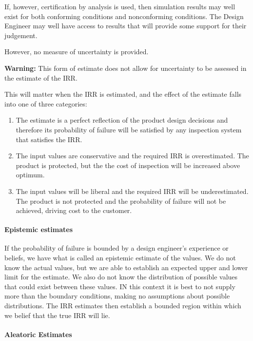 \documentclass[
]{article}
\providecommand{\tightlist}{%
  \setlength{\itemsep}{0pt}\setlength{\parskip}{0pt}}
\begin{document}
If, however, certification by analysis is used, then simulation results may well exist for both conforming conditions and nonconforming conditions. The Design Engineer may well have access to results that will provide some support for their judgement.

However, no measure of uncertainty is provided.

\textbf{Warning:} This form of estimate does not allow for uncertainty to be assessed in the estimate of the IRR.

This will matter when the IRR is estimated, and the effect of the estimate falls into one of three categories:

\begin{enumerate}
\def\labelenumi{\arabic{enumi}.}
\tightlist
\item
  The estimate is a perfect reflection of the product design decisions and therefore its probability of failure will be satisfied by any inspection system that satisfies the IRR.\\
\item
  The input values are conservative and the required IRR is overestimated. The product is protected, but the the cost of inspection will be increased above optimum.
\item
  The input values will be liberal and the required IRR will be underestimated. The product is not protected and the probability of failure will not be achieved, driving cost to the customer.
\end{enumerate}

\paragraph{Epistemic estimates}\label{epistemic-estimates}

If the probability of failure is bounded by a design engineer's experience or beliefs, we have what is called an epistemic estimate of the values. We do not know the actual values, but we are able to establish an expected upper and lower limit for the estimate. We also do not know the distribution of possible values that could exist between these values. IN this context it is best to not supply more than the boundary conditions, making no assumptions about possible distributions. The IRR estimates then establish a bounded region within which we belief that the true IRR will lie.

\paragraph{Aleatoric Estimates}\label{aleatoric-estimates}
\end{document}
